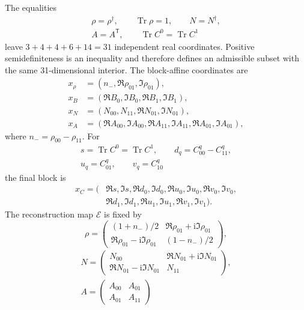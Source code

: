 \documentclass[10pt,twocolumn]{article}
\newcommand{\ii}{\mathrm i}
\newcommand{\Tr}{\operatorname{Tr}}
\begin{document}
The equalities
\begin{equation}
\begin{gathered}
\rho=\rho^\dagger,\qquad \Tr\rho=1,
\qquad N=N^\dagger,\\
A=A^{\mathsf T},\qquad \Tr C^0=\Tr C^1
\end{gathered}
\label{eq:linear-structure}
\end{equation}
leave $3+4+4+6+14=31$ independent real coordinates.  Positive
semidefiniteness is an inequality and therefore defines an admissible subset
with the same 31-dimensional interior.  The block-affine
coordinates are
\begin{equation}
\begin{aligned}
x_\rho&=(n_-,\Re\rho_{01},\Im\rho_{01}),\\
x_B&=(\Re B_0,\Im B_0,\Re B_1,\Im B_1),\\
x_N&=(N_{00},N_{11},\Re N_{01},\Im N_{01}),\\
x_A&=(\Re A_{00},\Im A_{00},\Re A_{11},\Im A_{11},
       \Re A_{01},\Im A_{01}),
\end{aligned}
\label{eq:coordinate-blocks-a}
\end{equation}
where $n_-=\rho_{00}-\rho_{11}$.  For
\begin{equation}
\begin{gathered}
s=\Tr C^0=\Tr C^1,\qquad d_q=C^q_{00}-C^q_{11},\\
u_q=C^q_{01},\qquad v_q=C^q_{10}
\end{gathered}
\label{eq:c-coordinate-definitions}
\end{equation}
the final block is
\begin{equation}
\begin{aligned}
x_C=(&\Re s,\Im s,\Re d_0,\Im d_0,\Re u_0,\Im u_0,
\Re v_0,\Im v_0,\\
&\Re d_1,\Im d_1,\Re u_1,\Im u_1,\Re v_1,\Im v_1).
\end{aligned}
\label{eq:c-coordinates}
\end{equation}
The reconstruction map $\mathcal E$ is fixed by
\begin{equation}
\rho=
\begin{pmatrix}
(1+n_-)/2&\Re\rho_{01}+\ii\Im\rho_{01}\\
\Re\rho_{01}-\ii\Im\rho_{01}&(1-n_-)/2
\end{pmatrix},
\label{eq:rho-reconstruction}
\end{equation}
\begin{equation}
\begin{gathered}
N=\begin{pmatrix}N_{00}&\Re N_{01}+\ii\Im N_{01}\\
\Re N_{01}-\ii\Im N_{01}&N_{11}\end{pmatrix},\\[2pt]
A=\begin{pmatrix}A_{00}&A_{01}\\A_{01}&A_{11}\end{pmatrix}
\end{gathered}
\label{eq:na-reconstruction}
\end{equation}
\end{document}
